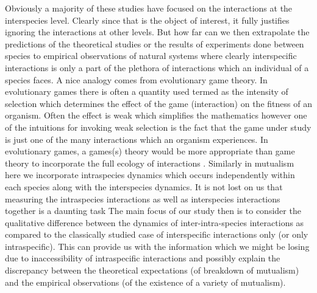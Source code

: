 \documentclass[12pt]{article}
\begin{document}
Obviously a majority of these studies have focused on the interactions at the interspecies level.
Clearly since that is the object of interest, it fully justifies ignoring the interactions at other levels.
But how far can we then extrapolate the predictions of the theoretical studies or the results of experiments done between species to empirical observations of natural systems where clearly interspecific interactions is only a part of the plethora of interactions which an individual of a species faces.
A nice analogy comes from evolutionary game theory.
In evolutionary games there is often a quantity used termed as the intensity of selection which determines the effect of the game (interaction) on the fitness of an organism. 
Often the effect is weak which simplifies the mathematics however one of the intuitions for invoking weak selection is the fact that the game under study is just one of the many interactions which an organism experiences.
In evolutionary games, a games(s) theory would be more appropriate than game theory to incorporate the full ecology of interactions \citep{bednar:RS:2007}.
Similarly in mutualism here we incorporate intraspecies dynamics which occurs independently within each species along with the interspecies dynamics.
It is not lost on us that measuring the intraspecies interactions as well as interspecies interactions together is a daunting task \citep{behm:JE:2014}
The main focus of our study then is to consider the qualitative difference between the dynamics of inter-intra-species interactions as compared to the classically studied case of interspecific interactions only (or only intraspecific).
This can provide us with the information which we might be losing due to inaccessibility of intraspecific interactions and possibly explain the discrepancy between the theoretical expectations (of breakdown of mutualism) and the empirical observations (of the existence of a  variety of mutualism).
\end{document}
